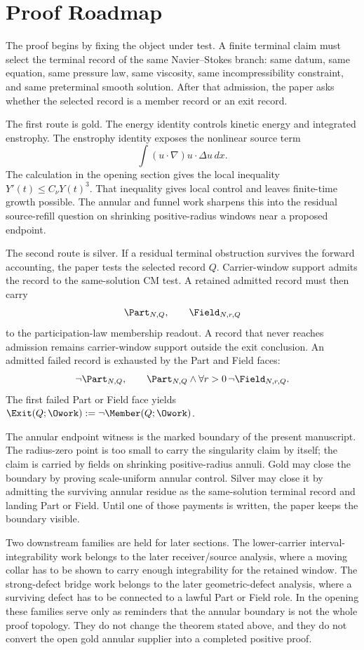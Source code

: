 \section{Proof Roadmap}

The proof begins by fixing the object under test.  A finite terminal claim must select the terminal record of the same Navier--Stokes branch: same datum, same equation, same pressure law, same viscosity, same incompressibility constraint, and same preterminal smooth solution.  After that admission, the paper asks whether the selected record is a member record or an exit record.

The first route is gold.  The energy identity controls kinetic energy and integrated enstrophy.  The enstrophy identity exposes the nonlinear source term
\[
  \int (u\cdot\nabla)u\cdot\Delta u\,dx.
\]
The calculation in the opening section gives the local inequality \(Y'(t)\le C_\nu Y(t)^3\).  That inequality gives local control and leaves finite-time growth possible.  The annular and funnel work sharpens this into the residual source-refill question on shrinking positive-radius windows near a proposed endpoint.

The second route is silver.  If a residual terminal obstruction survives the forward accounting, the paper tests the selected record \(Q\).  Carrier-window support admits the record to the same-solution CM test.  A retained admitted record must then carry
\[
  \Part_{N,Q},\qquad
  \Field_{N,r,Q}
\]
to the participation-law membership readout.  A record that never reaches admission remains carrier-window support outside the exit conclusion.  An admitted failed record is exhausted by the Part and Field faces:
\[
  \neg\Part_{N,Q},\qquad
  \Part_{N,Q}\wedge\forall r>0\,\neg\Field_{N,r,Q}.
\]
The first failed Part or Field face yields \(\Exit(Q;\Owork):=\neg\Member(Q;\Owork)\).

The annular endpoint witness is the marked boundary of the present manuscript.  The radius-zero point is too small to carry the singularity claim by itself; the claim is carried by fields on shrinking positive-radius annuli.  Gold may close the boundary by proving scale-uniform annular control.  Silver may close it by admitting the surviving annular residue as the same-solution terminal record and landing Part or Field.  Until one of those payments is written, the paper keeps the boundary visible.

Two downstream families are held for later sections.  The lower-carrier interval-integrability work belongs to the later receiver/source analysis, where a moving collar has to be shown to carry enough integrability for the retained window.  The strong-defect bridge work belongs to the later geometric-defect analysis, where a surviving defect has to be connected to a lawful Part or Field role.  In the opening these families serve only as reminders that the annular boundary is not the whole proof topology.  They do not change the theorem stated above, and they do not convert the open gold annular supplier into a completed positive proof.

